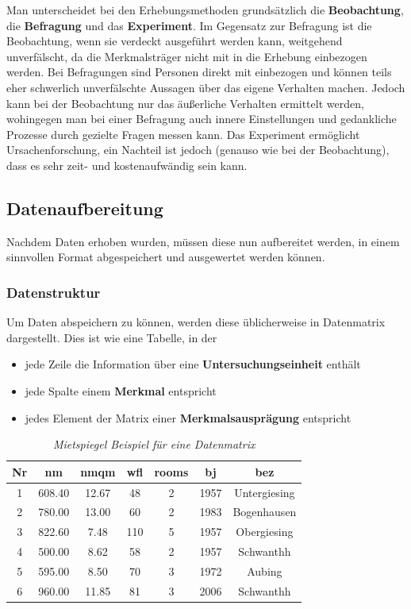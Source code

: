 \documentclass[a4paper]{article}
\begin{document}
Man unterscheidet bei den Erhebungsmethoden grundsätzlich die \textbf{Beobachtung}, die \textbf{Befragung} und das \textbf{Experiment}. Im Gegensatz zur Befragung ist die Beobachtung, wenn sie verdeckt ausgeführt werden kann, weitgehend unverfälscht, da die Merkmalstr\"ager nicht mit in die Erhebung einbezogen werden. Bei Befragungen sind Personen direkt mit einbezogen und können teils eher schwerlich unverfälschte Aussagen über das eigene Verhalten machen. Jedoch kann bei der Beobachtung nur das äußerliche Verhalten ermittelt werden, wohingegen man bei einer Befragung auch innere Einstellungen und gedankliche Prozesse durch gezielte Fragen messen kann. Das Experiment ermöglicht Ursachenforschung, ein Nachteil ist jedoch (genauso wie bei der Beobachtung), dass es sehr zeit- und kostenaufwändig sein kann.

\subsection{Datenaufbereitung}
Nachdem Daten erhoben wurden, müssen diese nun aufbereitet werden, in einem sinnvollen Format abgespeichert und ausgewertet werden können.

\subsubsection{Datenstruktur}\label{sec:struct}
Um Daten abspeichern zu können, werden diese üblicherweise in Datenmatrix dargestellt.
Dies ist wie eine Tabelle, in der 
\begin{itemize}
    \item jede Zeile die Information über eine \textbf{Untersuchungseinheit} enthält
    \item jede Spalte einem \textbf{Merkmal} entspricht
    \item jedes Element der Matrix einer \textbf{Merkmalsausprägung} entspricht
\end{itemize}

\begin{table}[H]
\centering 
\begin{tabular}{ccccccc}
   \hline
    Nr         & nm & nmqm & wfl & rooms & bj & bez\\
     \hline
    1   & 608.40 & 12.67 & 48 & 2 &1957 & Untergiesing\\      
    2   &780.00 & 13.00 & 60 & 2 & 1983 & Bogenhausen\\ 
    
    3  & 822.60 & 7.48 & 110 & 5 & 1957 & Obergiesing\\
    
    4  & 500.00  & 8.62 & 58 & 2 & 1957 & Schwanthh \\
    5  & 595.00  & 8.50 & 70 & 3 & 1972 & Aubing \\
    6  &960.00   & 11.85& 81 & 3 & 2006 & Schwanthh\\
     \hline
             
\end{tabular}
    \caption{\textit{Mietspiegel Beispiel für eine Datenmatrix}}
    \label{tab:Datenmatrix}
\end{table}
\end{document}
